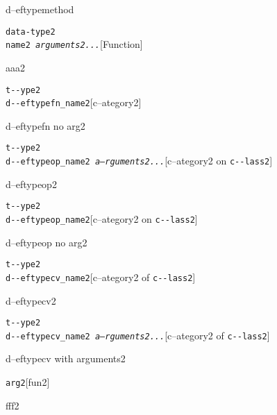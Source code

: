 \documentclass{book}
\begin{document}
%
d--eftypemethod


\noindent\texttt{data-type2\leavevmode{}\\name2 \bgroup{}\normalfont{}\textsl{arguments2...}\egroup{}}\hfill[Function]



%
aaa2

\noindent\texttt{t{-}{-}ype2\leavevmode{}\\d{-}{-}eftypefn\_name2}\hfill[c--ategory2]



%
d--eftypefn no arg2

\noindent\texttt{t{-}{-}ype2\leavevmode{}\\d{-}{-}eftypeop\_name2 \bgroup{}\normalfont{}\textsl{a--rguments2...}\egroup{}}\hfill[c--ategory2 on \texttt{c{-}{-}lass2}]



%
d--eftypeop2

\noindent\texttt{t{-}{-}ype2\leavevmode{}\\d{-}{-}eftypeop\_name2}\hfill[c--ategory2 on \texttt{c{-}{-}lass2}]



%
d--eftypeop no arg2

\noindent\texttt{t{-}{-}ype2\leavevmode{}\\d{-}{-}eftypecv\_name2}\hfill[c--ategory2 of \texttt{c{-}{-}lass2}]



%
d--eftypecv2

\noindent\texttt{t{-}{-}ype2\leavevmode{}\\d{-}{-}eftypecv\_name2 \bgroup{}\normalfont{}\textsl{a--rguments2...}\egroup{}}\hfill[c--ategory2 of \texttt{c{-}{-}lass2}]



%
d--eftypecv with arguments2

\noindent\texttt{arg2}\hfill[fun2]



%
fff2
\end{document}
